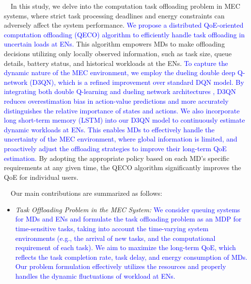 \documentclass[12pt,draftclsnofoot,onecolumn]{IEEEtran}
\newenvironment{my}[2]%
{\begin{list}{}%
{\setlength{\rightmargin}{#1}\setlength{\leftmargin}{#2}}%


 \item[]{}

} {\end{list}}
\begin{document}
\begin{enumerate}
\begin{my}{1cm}{1cm}
{		\,\,\,\,
		In this study, we delve into the computation task offloading problem in MEC systems, where strict task processing deadlines and energy constraints can adversely affect the system performance.   \textcolor{blue}{We propose a distributed QoE-oriented computation offloading (QECO) algorithm to efficiently handle task offloading in uncertain loads at ENs.} This algorithm empowers MDs to make offloading decisions utilizing only locally observed information, such as task size, queue details, battery status, and historical workloads at the ENs. 
		\textcolor{blue}{To capture the dynamic nature of the MEC environment, we employ the dueling double deep Q-network (D3QN), which is a refined improvement over standard DQN model. By integrating both double Q-learning \cite{van2016deep} and dueling network architectures \cite{wang2016dueling}, D3QN reduces overestimation bias in action-value predictions and more accurately distinguishes the relative importance of states and actions. We also incorporate long short-term memory (LSTM) \cite{hochreiter1997long} into our D3QN model to continuously estimate dynamic workloads at ENs. This enables MDs to effectively handle the uncertainty of the MEC environment, where global information is limited, and proactively adjust the offloading strategies to improve their long-term QoE estimation.} By adopting the appropriate policy based on each MD’s specific requirements at any given time, the QECO algorithm significantly improves the QoE for individual users. \vspace{3mm}
		
		\,\,\,\,
		Our main contributions are summarized as follows:
		
		\begin{itemize}
			\item \textit{Task Offloading Problem in the MEC System:} \textcolor{blue}{ We consider queuing systems for MDs and ENs and formulate the task offloading problem as an MDP for time-sensitive tasks, taking into account the time-varying system environments (e.g., the arrival of new tasks, and the computational requirement of each task). We aim to maximize the long-term QoE, which reflects the task completion rate, task delay, and energy consumption of MDs. Our problem formulation effectively utilizes the resources and properly handles the dynamic fluctuations of workload at ENs. }
			
			
			

\end{itemize}}
\end{my}
\end{enumerate}
\end{document}
